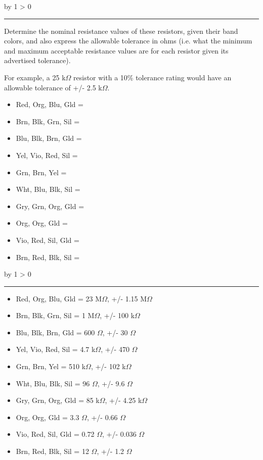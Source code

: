 \documentclass[12pt,a4paper]{article}
\def\oppgave{
            \advance\questnum by 1
            \ifnum \questnum > 0
                 \hrule
                 \vskip 3pt
                 \leftline{Oppgave \the\questnum}
                 \vskip 3pt \fi}
\def\svar{
           \advance\answnum by 1
           \ifnum \answnum > 0
                \hrule
                \vskip 3pt
                \leftline{Svar \the\answnum}
                \vskip 3pt \fi}
\begin{document}

\vfil \eject 



\oppgave{} 

Determine the nominal resistance values of these resistors, given their band colors, and also express the allowable tolerance in ohms (i.e. what the minimum and maximum acceptable resistance values are for each resistor given its advertised tolerance). 

For example, a 25 k$\Omega$ resistor with a 10\% tolerance rating would have an allowable tolerance of +/- 2.5 k$\Omega$.

\begin{itemize}
\item{} Red, Org, Blu, Gld = 
\item{} Brn, Blk, Grn, Sil = 
\item{} Blu, Blk, Brn, Gld = 
\item{} Yel, Vio, Red, Sil = 
\item{} Grn, Brn, Yel =      
\item{} Wht, Blu, Blk, Sil =
\item{} Gry, Grn, Org, Gld =
\item{} Org, Org, Gld =
\item{} Vio, Red, Sil, Gld =
\item{} Brn, Red, Blk, Sil =
\end{itemize}

\vskip 10pt \filbreak 





\svar{} 

\begin{itemize}
\item{} Red, Org, Blu, Gld = 23 M$\Omega$, +/- 1.15 M$\Omega$
\item{} Brn, Blk, Grn, Sil = 1 M$\Omega$, +/- 100 k$\Omega$
\item{} Blu, Blk, Brn, Gld = 600 $\Omega$, +/- 30 $\Omega$
\item{} Yel, Vio, Red, Sil = 4.7 k$\Omega$, +/- 470 $\Omega$
\item{} Grn, Brn, Yel = 510 k$\Omega$, +/- 102 k$\Omega$
\item{} Wht, Blu, Blk, Sil = 96 $\Omega$, +/- 9.6 $\Omega$
\item{} Gry, Grn, Org, Gld = 85 k$\Omega$, +/- 4.25 k$\Omega$
\item{} Org, Org, Gld = 3.3 $\Omega$, +/- 0.66 $\Omega$
\item{} Vio, Red, Sil, Gld = 0.72 $\Omega$, +/- 0.036 $\Omega$
\item{} Brn, Red, Blk, Sil = 12 $\Omega$, +/- 1.2 $\Omega$
\end{itemize}
\end{document}
